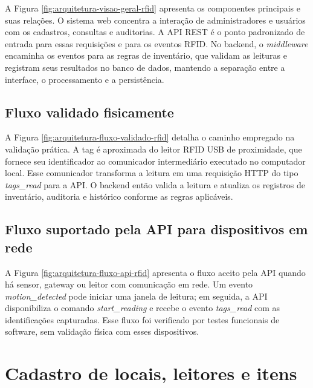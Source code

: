 A Figura \ref{fig:arquitetura-visao-geral-rfid} apresenta os componentes principais e suas relações. O sistema web concentra a interação de administradores e usuários com os cadastros, consultas e auditorias. A API REST é o ponto padronizado de entrada para essas requisições e para os eventos RFID. No backend, o \textit{middleware} encaminha os eventos para as regras de inventário, que validam as leituras e registram seus resultados no banco de dados, mantendo a separação entre a interface, o processamento e a persistência.



\clearpage
\subsection{Fluxo validado fisicamente}

A Figura \ref{fig:arquitetura-fluxo-validado-rfid} detalha o caminho empregado na validação prática. A tag é aproximada do leitor RFID USB de proximidade, que fornece seu identificador ao comunicador intermediário executado no computador local. Esse comunicador transforma a leitura em uma requisição HTTP do tipo \textit{tags\_read} para a API. O backend então valida a leitura e atualiza os registros de inventário, auditoria e histórico conforme as regras aplicáveis.



\clearpage
\subsection{Fluxo suportado pela API para dispositivos em rede}

A Figura \ref{fig:arquitetura-fluxo-api-rfid} apresenta o fluxo aceito pela API quando há sensor, gateway ou leitor com comunicação em rede. Um evento \textit{motion\_detected} pode iniciar uma janela de leitura; em seguida, a API disponibiliza o comando \textit{start\_reading} e recebe o evento \textit{tags\_read} com as identificações capturadas. Esse fluxo foi verificado por testes funcionais de software, sem validação física com esses dispositivos.



\clearpage

\section{Cadastro de locais, leitores e itens}
\label{sec:cadastro-locais-leitores-itens}

